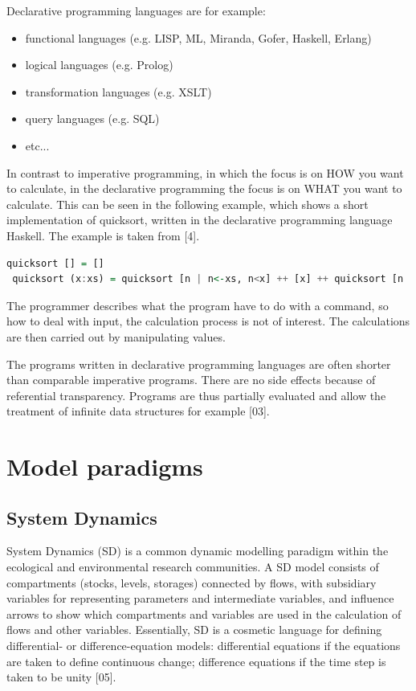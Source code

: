 \par
Declarative programming languages are for example:
\begin{itemize}
	\item functional languages (e.g. LISP, ML, Miranda, Gofer, Haskell, Erlang)
	\item logical languages (e.g. Prolog)
	\item transformation languages (e.g. XSLT)
	\item query languages (e.g. SQL)
	\item etc...
\end{itemize}

\par
In contrast to imperative programming, in which the focus is on HOW you want to calculate, in the declarative programming the focus is on WHAT you want to calculate. This can be seen in the following example, which shows a short implementation of quicksort, written in the declarative programming language Haskell. The example is taken from [4]. %
\begin{lstlisting}[language=Haskell]
 quicksort [] = []
 quicksort (x:xs) = quicksort [n | n<-xs, n<x] ++ [x] ++ quicksort [n | n<-xs, n>=x]
\end{lstlisting}
The programmer describes what the program have to do with a command, so how to deal with input, the calculation process is not of interest. The calculations are then carried out by manipulating values.
\par
The programs written in declarative programming languages are often shorter than comparable imperative programs. There are no side effects because of referential transparency. Programs are thus partially evaluated and allow the treatment of infinite data structures for example [03].
\section{Model paradigms}
\subsection{System Dynamics}
\par
System Dynamics (SD) is a common dynamic modelling paradigm within the ecological and environmental research communities. A SD model consists of compartments (stocks, levels, storages) connected by flows, with subsidiary variables for representing parameters and intermediate variables, and influence arrows to show which compartments and variables are used in the calculation of flows and other variables. Essentially, SD is a cosmetic language for defining differential- or difference-equation models: differential equations if the equations are taken to define continuous change; difference equations if the time step is taken to be unity [05]. %


